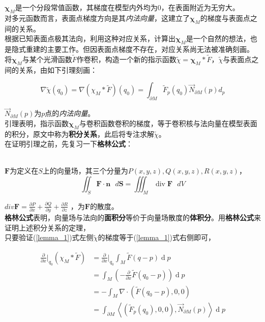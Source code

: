 $\mathbf{\chi}_M$是一个分段常值函数，其梯度在模型内外均为$0$，在表面附近为无穷大。\\

对多元函数而言，表面点梯度方向是其\textit{内法向量}，这建立了$\mathbf{\chi}_M$的梯度与表面点之间的关系。\\

根据已知表面点极其法向，利用这种对应关系，计算出$\mathbf{\chi}_M$是一个自然的想法，也是隐式重建的主要工作。但因表面点梯度不存在，对应关系尚无法被准确刻画。\\

将$\mathbf{\chi}_M$与某个光滑函数$\tilde{F}$作卷积，构造一个新的指示函数$\tilde{\chi} = \mathbf{\chi}_M * \tilde{F}$，$\tilde{\chi}$与表面点之间的关系，由如下引理刻画：

\begin{equation}
	\nabla \tilde{\chi}(q_0) = \nabla(\chi_M * \tilde{F})(q_0) = \int_{\partial{M}}\tilde{F}_p(q_0)\overrightarrow{N}_{\partial{M}}(p)d_p \label{lemma_1}
\end{equation}

$\overrightarrow{N}_{\partial{M}}(p)$为$p$点的\textit{内法向量}。\\

引理表明，指示函数$\mathbf{\chi}_M$与卷积函数卷积的梯度，等于卷积核与法向量在模型表面的积分，原文中称为\textbf{积分关系}，此后将专注求解$\tilde{\chi}$。\\

在证明引理之前，先复习一下\textbf{格林公式}：

 \\

$\mathbf{F}$为定义在$S$上的向量场，其三个分量为$P(x,y,z), Q(x,y,z), R(x,y,z)$，
$$
\iint_{S}\mathbf{F}\cdot\mathbf{n} \text{ } d \mathbf{S} = \iiint_M \mathop{div} \mathbf{F} \text{ }  dV 
$$


$
div \mathbf{F} = \frac{\partial P}{\partial x} + \frac{\partial Q}{\partial y} + \frac{\partial R}{\partial z}
$
，为$\mathbf{F}$的散度。\\

\textbf{格林公式}表明，向量场与法向的\textbf{面积分}等价于向量场散度的\textbf{体积分}。用\textbf{格林公式}来证明上述积分关系的定理，\\

\proof 只要验证(\ref{lemma_1})式左侧$\tilde{\chi}$的梯度等于(\ref{lemma_1})式右侧即可，

\begin{align}
	\frac{\partial}{\partial x}\bigg |_{q_0} (\chi_M * \tilde{F}) &= \frac{\partial}{\partial x}\bigg |_{q_0} \int_M \tilde{F}(q-p) \mathop{d}p \label{proof_1}\\
	&= \int_M \left(-\frac{\partial}{\partial x}\tilde{F}(q_0 - p)\right)\mathop{d}p \label{proof_2}\\
	&= -\int_M \nabla \cdot \left(\tilde{F}(q_0 - p),0,0\right)\label{proof_3}\\
	&= \int_{\partial M}
		\left <
			\left(
				\tilde{F}_p(q_0),0,0
			\right)
			,
			\overrightarrow{N}_{\partial M}(p)
		\right>\mathop{d}p \label{proof_4}
\end{align}


